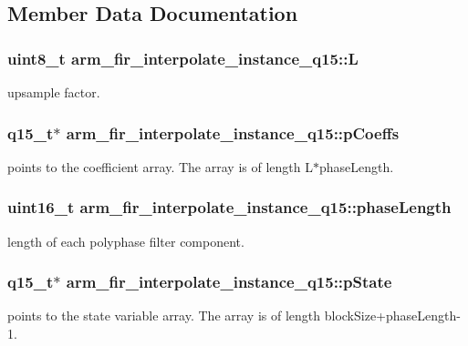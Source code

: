 \subsection{Member Data Documentation}
\hypertarget{structarm__fir__interpolate__instance__q15_a5431bdc079e72a973b51d359f7f13603}{
\subsubsection[{L}]{\setlength{\rightskip}{0pt plus 5cm}uint8\-\_\-t arm\-\_\-fir\-\_\-interpolate\-\_\-instance\-\_\-q15\-::\-L}}\label{structarm__fir__interpolate__instance__q15_a5431bdc079e72a973b51d359f7f13603}
upsample factor. \hypertarget{structarm__fir__interpolate__instance__q15_a767d91d61d4c0beeddd4325d28d28e24}{
\subsubsection[{p\-Coeffs}]{\setlength{\rightskip}{0pt plus 5cm}q15\-\_\-t$\ast$ arm\-\_\-fir\-\_\-interpolate\-\_\-instance\-\_\-q15\-::p\-Coeffs}}\label{structarm__fir__interpolate__instance__q15_a767d91d61d4c0beeddd4325d28d28e24}
points to the coefficient array. The array is of length L$\ast$phase\-Length. \hypertarget{structarm__fir__interpolate__instance__q15_ad5178a02a697a77e0d0e60705d9f0a19}{
\subsubsection[{phase\-Length}]{\setlength{\rightskip}{0pt plus 5cm}uint16\-\_\-t arm\-\_\-fir\-\_\-interpolate\-\_\-instance\-\_\-q15\-::phase\-Length}}\label{structarm__fir__interpolate__instance__q15_ad5178a02a697a77e0d0e60705d9f0a19}
length of each polyphase filter component. \hypertarget{structarm__fir__interpolate__instance__q15_a26b864363fa47954248f2590e3a82a3c}{
\subsubsection[{p\-State}]{\setlength{\rightskip}{0pt plus 5cm}q15\-\_\-t$\ast$ arm\-\_\-fir\-\_\-interpolate\-\_\-instance\-\_\-q15\-::p\-State}}\label{structarm__fir__interpolate__instance__q15_a26b864363fa47954248f2590e3a82a3c}
points to the state variable array. The array is of length block\-Size+phase\-Length-\/1. 

